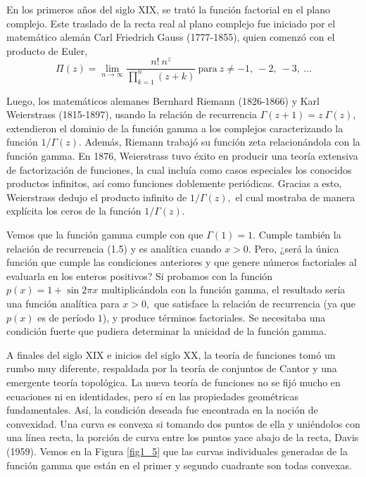 En los primeros años del siglo XIX, se trató la función factorial en el plano complejo. Este traslado de la recta real al plano complejo fue iniciado por el matemático alemán Carl Friedrich Gauss (1777-1855), quien comenzó con el producto de Euler, $$\Pi(z) = \lim\limits_{n\rightarrow\infty} \frac{n!\ n^z}{\prod_{k=1}^{n}(z+k)}\ \textrm{para}\ z \neq -1,\ -2,\ -3,\ \dots$$

Luego, los matemáticos alemanes Bernhard Riemann (1826-1866) y Karl Weierstrass (1815-1897), usando la relación de recurrencia $\Gamma(z+1) = z\ \Gamma(z),$ extendieron el dominio de la función gamma a los complejos caracterizando la función $1/\Gamma(z).$ Además, Riemann trabajó su función zeta relacionándola con la función gamma. En 1876, Weierstrass tuvo éxito en producir una teoría extensiva de factorización de funciones, la cual incluía como casos especiales los conocidos productos infinitos, así como funciones doblemente periódicas. Gracias a esto, Weierstrass dedujo el producto infinito de $1/\Gamma(z),$ el cual mostraba de manera explícita los ceros de la función $1/\Gamma(z).$

Vemos que la función gamma cumple con que $\Gamma(1) = 1.$ Cumple también la relación de recurrencia (1.5) y es analítica cuando $x>0.$ Pero, ¿será la única función que cumple las condiciones anteriores y que genere números factoriales al evaluarla en los enteros positivos? Si probamos con la función $p(x) = 1+\sin 2\pi x$ multiplicándola con la función gamma, el resultado sería una función analítica para $x>0,$ que satisface la relación de recurrencia (ya que $p(x)$ es de período $1$), y produce términos factoriales. Se necesitaba una condición fuerte que pudiera determinar la unicidad de la función gamma.

A finales del siglo XIX e inicios del siglo XX, la teoría de funciones tomó un rumbo muy diferente, respaldada por la teoría de conjuntos de Cantor y una emergente teoría topológica. La nueva teoría de funciones no se fijó mucho en ecuaciones ni en identidades, pero sí en las propiedades geométricas fundamentales. Así, la condición deseada fue encontrada en la noción de convexidad. Una curva es convexa si tomando dos puntos de ella y uniéndolos con una línea recta, la porción de curva entre los puntos yace abajo de la recta, Davis (1959). Vemos en la Figura \ref{fig1_5} que las curvas individuales generadas de la función gamma que están en el primer y segundo cuadrante son todas convexas. 

